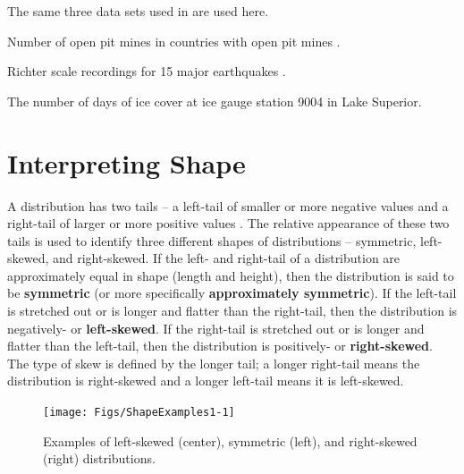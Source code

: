 \documentclass[10pt,openany]{book}\usepackage[]{graphicx}\usepackage[]{color}
\newenvironment{knitrout}{}{} %
\begin{document}
The same three data sets used in  are used here.

\vspace{-12pt}
\begin{Itemize}
  \item Number of open pit mines in countries with open pit mines .
  \item Richter scale recordings for 15 major earthquakes .
  \item The number of days of ice cover at ice gauge station 9004 in Lake Superior.
\end{Itemize}

\section{Interpreting Shape}
A distribution has two tails -- a left-tail of smaller or more negative values and a right-tail of larger or more positive values . The relative appearance of these two tails is used to identify three different shapes of distributions -- symmetric, left-skewed, and right-skewed. If the left- and right-tail of a distribution are approximately equal in shape (length and height), then the distribution is said to be \textbf{symmetric} (or more specifically \textbf{approximately symmetric}). If the left-tail is stretched out or is longer and flatter than the right-tail, then the distribution is negatively- or \textbf{left-skewed}. If the right-tail is stretched out or is longer and flatter than the left-tail, then the distribution is positively- or \textbf{right-skewed}. The type of skew is defined by the longer tail; a longer right-tail means the distribution is right-skewed and a longer left-tail means it is left-skewed.

\begin{knitrout}
\color{fgcolor}\begin{figure}[hbtp]

{\centering \texttt{[image: Figs/ShapeExamples1-1]} 

}

\caption[Examples of left-skewed (center), symmetric (left), and right-skewed (right) distributions]{Examples of left-skewed (center), symmetric (left), and right-skewed (right) distributions.}\label{fig:ShapeExamples1}
\end{figure}


\end{knitrout}
\end{document}
